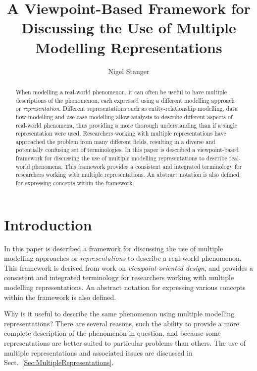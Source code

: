 \documentclass[11pt,oribibl]{llncs}
\title{A Viewpoint-Based Framework for Discussing the Use of Multiple Modelling Representations}
\author{Nigel Stanger}
\institute{University of Otago, Dunedin, New Zealand \\ \email{nstanger@infoscience.otago.ac.nz}}
\begin{document}
\maketitle

\begin{abstract}
When modelling a real-world phenomenon, it can often be useful to have multiple descriptions of the phenomenon, each expressed using a different modelling approach or \emph{representation}. Different representations such as entity-relationship modelling, data flow modelling and use case modelling allow analysts to describe different aspects of real-world phenomena, thus providing a more thorough understanding than if a single representation were used. Researchers working with multiple representations have approached the problem from many different fields, resulting in a diverse and potentially confusing set of terminologies. In this paper is described a viewpoint-based framework for discussing the use of multiple modelling representations to describe real-world phenomena. This framework provides a consistent and integrated terminology for researchers working with multiple representations. An abstract notation is also defined for expressing concepts within the framework.
\end{abstract}


\section{Introduction}
\label{Sec:Introduction}

In this paper is described a framework for discussing the use of multiple modelling approaches or \emph{representations} to describe a real-world phenomenon. This framework is derived from work on \emph{viewpoint-oriented design}, and provides a consistent and integrated terminology for researchers working with multiple modelling representations. An abstract notation for expressing various concepts within the framework is also defined.

Why is it useful to describe the same phenomenon using multiple modelling representations? There are several reasons, such the ability to provide a more complete description of the phenomenon in question, and because some representations are better suited to particular problems than others. The use of multiple representations and associated issues are discussed in Sect.~\ref{Sec:MultipleRepresentations}.
\end{document}
